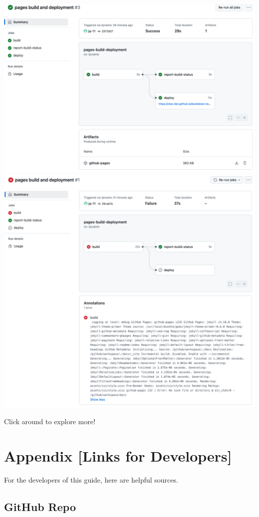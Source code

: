 \documentclass[
]{book}
\theoremstyle{definition}
\theoremstyle{definition}
\theoremstyle{definition}
\theoremstyle{definition}
\theoremstyle{remark}
\begin{document}
\includegraphics{img/git-instruct/successful-deploy.png}
\includegraphics{img/git-instruct/failed-deploy.png}

Click around to explore more!

\chapter{Appendix {[}Links for Developers{]}}\label{appendix-links-for-developers}

For the developers of this guide, here are helpful sources.

\section{GitHub Repo}\label{github-repo}
\end{document}
